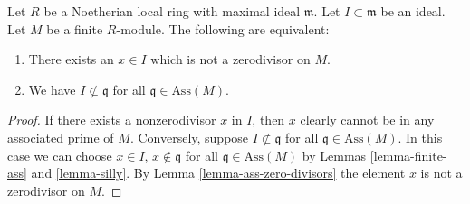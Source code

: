 \begin{lemma}
\label{lemma-ideal-nonzerodivisor}
Let $R$ be a Noetherian local ring with
maximal ideal $\mathfrak m$. Let $I \subset \mathfrak m$
be an ideal. Let $M$ be a finite $R$-module.
The following are equivalent:
\begin{enumerate}
\item There exists an $x \in I$ which is not a zerodivisor on $M$.
\item We have $I \not \subset \mathfrak q$ for all
$\mathfrak q \in \text{Ass}(M)$.
\end{enumerate}
\end{lemma}

\begin{proof}
If there exists a nonzerodivisor $x$ in $I$,
then $x$ clearly cannot be in any associated
prime of $M$. Conversely, suppose $I \not \subset \mathfrak q$
for all $\mathfrak q \in \text{Ass}(M)$. In this case we can
choose $x \in I$, $x \not \in \mathfrak q$ for all
$\mathfrak q \in \text{Ass}(M)$ by Lemmas
\ref{lemma-finite-ass} and \ref{lemma-silly}.
By Lemma \ref{lemma-ass-zero-divisors} the element $x$
is not a zerodivisor on $M$.
\end{proof}
